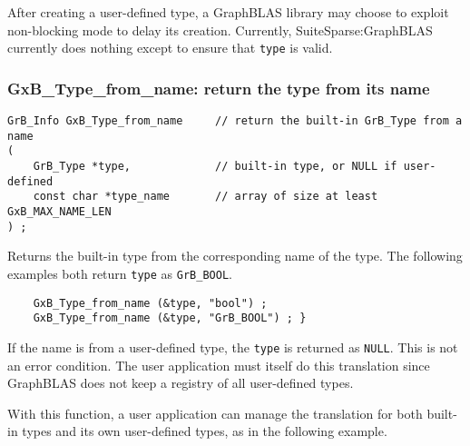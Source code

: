 \documentclass[12pt]{article}
\begin{document}
After creating a user-defined type, a GraphBLAS library may choose to exploit
non-blocking mode to delay its creation.  Currently, SuiteSparse:GraphBLAS
currently does nothing except to ensure that \verb'type' is valid.

\newpage
\subsubsection{{\sf GxB\_Type\_from\_name:} return the type from its name}
\label{type_from_name}

\begin{mdframed}[userdefinedwidth=6in]
{\footnotesize
\begin{verbatim}
GrB_Info GxB_Type_from_name     // return the built-in GrB_Type from a name
(
    GrB_Type *type,             // built-in type, or NULL if user-defined
    const char *type_name       // array of size at least GxB_MAX_NAME_LEN
) ;
\end{verbatim}
}\end{mdframed}

Returns the built-in type from the corresponding name of the type.  The following
examples both return \verb'type' as \verb'GrB_BOOL'.

{\footnotesize
\begin{verbatim}
    GxB_Type_from_name (&type, "bool") ;
    GxB_Type_from_name (&type, "GrB_BOOL") ; }\end{verbatim} }

If the name is from a user-defined type, the \verb'type' is returned as
\verb'NULL'.  This is not an error condition.  The user application must itself
do this translation since GraphBLAS does not keep a registry of all
user-defined types.

With this function, a user application can manage the translation for
both built-in types and its own user-defined types, as in the following
example.
\end{document}
